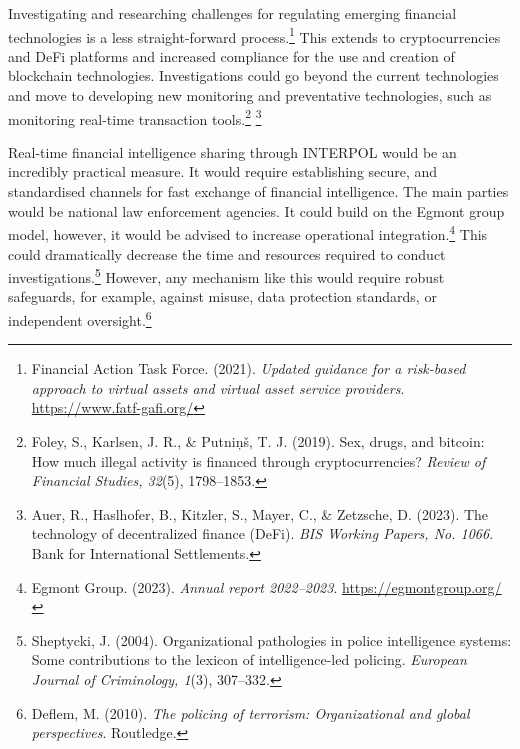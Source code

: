 Investigating and researching challenges for regulating emerging financial technologies is a less straight-forward process.\footnote{Financial Action Task Force. (2021). \emph{Updated guidance for a risk-based approach to virtual assets and virtual asset service providers}. \url{https://www.fatf-gafi.org/}} This extends to cryptocurrencies and DeFi platforms and increased compliance for the use and creation of blockchain technologies. Investigations could go beyond the current technologies and move to developing new monitoring and preventative technologies, such as monitoring real-time transaction tools.\footnote{Foley, S., Karlsen, J. R., \& Putniņš, T. J. (2019). Sex, drugs, and bitcoin: How much illegal activity is financed through cryptocurrencies? \emph{Review of Financial Studies, 32}(5), 1798–1853.} \footnote{Auer, R., Haslhofer, B., Kitzler, S., Mayer, C., \& Zetzsche, D. (2023). The technology of decentralized finance (DeFi). \emph{BIS Working Papers, No. 1066}. Bank for International Settlements.}

Real-time financial intelligence sharing through INTERPOL would be an incredibly practical measure. It would require establishing secure, and standardised channels for fast exchange of financial intelligence. The main parties would be national law enforcement agencies. It could build on the Egmont group model, however, it would be advised to increase operational integration.\footnote{Egmont Group. (2023). \emph{Annual report 2022–2023}. \url{https://egmontgroup.org/}} This could dramatically decrease the time and resources required to conduct investigations.\footnote{Sheptycki, J. (2004). Organizational pathologies in police intelligence systems: Some contributions to the lexicon of intelligence-led policing. \emph{European Journal of Criminology, 1}(3), 307–332.} However, any mechanism like this would require robust safeguards, for example, against misuse, data protection standards, or independent oversight.\footnote{Deflem, M. (2010). \emph{The policing of terrorism: Organizational and global perspectives}. Routledge.}
